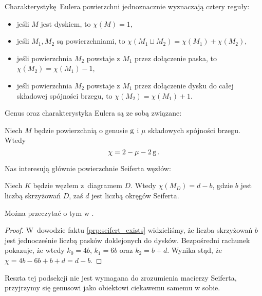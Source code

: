 \begin{proposition}
    Charakterystykę Eulera powierzchni jednoznacznie wyznaczają cztery reguły:
    \begin{itemize}
        \item jeśli $M$ jest dyskiem, to $\chi(M) = 1$,
        \item jeśli $M_1, M_2$ są powierzchniami, to $\chi(M_1 \sqcup M_2) = \chi(M_1) + \chi(M_2)$,
        \item jeśli powierzchnia $M_2$ powstaje z $M_1$ przez dołączenie paska, to $\chi(M_2) = \chi(M_1) - 1$,
        \item jeśli powierzchnia $M_2$ powstaje z $M_1$ przez dołączenie dysku do całej składowej spójności brzegu, to $\chi(M_2) = \chi(M_1) + 1$.
    \end{itemize}
\end{proposition}

Genus oraz charakterystyka Eulera są ze sobą związane:

\begin{proposition}
    Niech $M$ będzie powierzchnią o genusie $\operatorname{g}$ i $\mu$ składowych spójności brzegu.
    Wtedy
    \begin{equation}
        \chi = 2 - \mu - 2\operatorname{g}.
    \end{equation}
\end{proposition}

Nas interesują głównie powierzchnie Seiferta węzłów:

\begin{proposition}
    \label{prp:seifert_euler_characteristics}
    Niech $K$ będzie węzłem z~diagramem $D$.
    Wtedy $\chi(M_D) = d - b$, gdzie $b$ jest liczbą skrzyżowań $D$, zaś $d$ jest liczbą okręgów Seiferta.
\end{proposition}

Można przeczytać o tym w \cite[s. 82]{murasugi96}.

\begin{proof}
    W~dowodzie faktu \ref{prp:seifert_exists} widzieliśmy, że liczba skrzyżowań $b$ jest jednocześnie liczbą pasków doklejonych do dysków.
    Bezpośredni rachunek pokazuje, że wtedy $k_0 = 4b$, $k_1 = 6b$ oraz $k_2 = b+d$.
    Wynika stąd, że $\chi = 4b - 6b + b + d = d - b$.
\end{proof}

Reszta tej podsekcji nie jest wymagana do zrozumienia macierzy Seiferta, przyjrzymy się genusowi jako obiektowi ciekawemu samemu w sobie.

